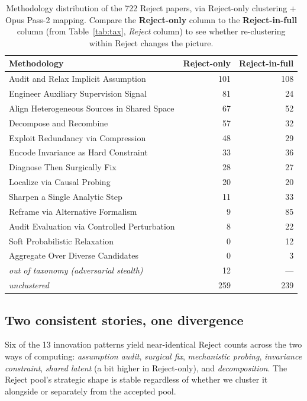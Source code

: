 \documentclass[10pt,a4paper]{article}
\begin{document}
\begin{table}[htbp]
\centering
\caption{Methodology distribution of the 722 Reject papers, via Reject-only clustering + Opus Pass-2 mapping. Compare the \textbf{Reject-only} column to the \textbf{Reject-in-full} column (from Table~\ref{tab:tax}, \emph{Reject} column) to see whether re-clustering within Reject changes the picture.}
\label{tab:rejmap}
\small
\begin{tabular}{p{6.5cm} rr}
\toprule
\textbf{Methodology} & \textbf{Reject-only} & \textbf{Reject-in-full} \\
\midrule
Audit and Relax Implicit Assumption & 101 & 108 \\
Engineer Auxiliary Supervision Signal &  81 &  24 \\
Align Heterogeneous Sources in Shared Space &  67 &  52 \\
Decompose and Recombine &  57 &  32 \\
Exploit Redundancy via Compression &  48 &  29 \\
Encode Invariance as Hard Constraint &  33 &  36 \\
Diagnose Then Surgically Fix &  28 &  27 \\
Localize via Causal Probing &  20 &  20 \\
Sharpen a Single Analytic Step &  11 &  33 \\
Reframe via Alternative Formalism &   9 &  85 \\
Audit Evaluation via Controlled Perturbation &   8 &  22 \\
Soft Probabilistic Relaxation &   0 &  12 \\
Aggregate Over Diverse Candidates &   0 &   3 \\
\textit{out of taxonomy (adversarial stealth)} & 12 & --- \\
\textit{unclustered} & 259 & 239 \\
\bottomrule
\end{tabular}
\end{table}

\subsection{Two consistent stories, one divergence}

Six of the 13 innovation patterns yield near-identical Reject counts across the two ways of computing: \emph{assumption audit}, \emph{surgical fix}, \emph{mechanistic probing}, \emph{invariance constraint}, \emph{shared latent} (a bit higher in Reject-only), and \emph{decomposition}. The Reject pool's strategic shape is stable regardless of whether we cluster it alongside or separately from the accepted pool.
\end{document}
